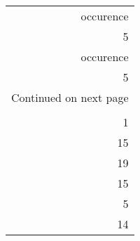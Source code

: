 \begin{longtable}{r}
\toprule
 occurence \\
         5 \\
\midrule
\endfirsthead

\toprule
 occurence \\
         5 \\
\midrule
\endhead
\midrule
\multicolumn{1}{r}{{Continued on next page}} \\
\midrule
\endfoot

\bottomrule
\endlastfoot
        19 \\
         1 \\
        15 \\
        19 \\
        15 \\
         5 \\
        14 \\
\end{longtable}
